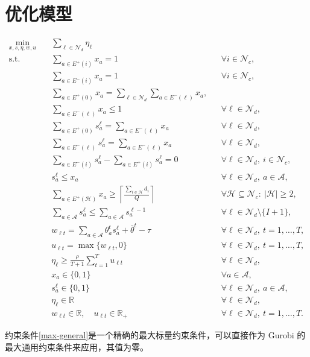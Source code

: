 \documentclass[11pt]{article}
\begin{document}
\section{优化模型}

\begin{align}
\min_{x,s,\eta,w,u}\quad
&\sum_{\ell\in\mathcal{N}_d}\eta_\ell
\label{obj}\\[1ex]
\text{s.t.}\quad
&\sum_{a\in E^+(i)}x_a=1
&&\forall i\in\mathcal{N}_c,
\label{customer-out}\\
&\sum_{a\in E^-(i)}x_a=1
&&\forall i\in\mathcal{N}_c,
\label{customer-in}\\
&\sum_{a\in E^+(0)}x_a
 =\sum_{\ell\in\mathcal{N}_d}\sum_{a\in E^-(\ell)}x_a,
\label{depot-balance}\\
&\sum_{a\in E^-(\ell)}x_a\leq 1
&&\forall \ell\in\mathcal{N}_d,
\label{destination-use}\\
&\sum_{a\in E^+(0)}s_a^\ell
 =\sum_{a\in E^-(\ell)}x_a
&&\forall \ell\in\mathcal{N}_d,
\label{route-start}\\
&\sum_{a\in E^-(\ell)}s_a^\ell
 =\sum_{a\in E^-(\ell)}x_a
&&\forall \ell\in\mathcal{N}_d,
\label{route-end}\\
&\sum_{a\in E^-(i)}s_a^\ell
 -\sum_{a\in E^+(i)}s_a^\ell=0
&&\forall \ell\in\mathcal{N}_d,\ i\in\mathcal{N}_c,
\label{route-flow}\\
&s_a^\ell\leq x_a
&&\forall \ell\in\mathcal{N}_d,\ a\in\mathcal{A},
\label{route-link}\\
&\sum_{a\in E^+(\mathcal{H})}x_a
 \geq
 \left\lceil\frac{\sum_{i\in\mathcal{H}}d_i}{Q}\right\rceil
&&\forall \mathcal{H}\subseteq\mathcal{N}_c:\ |\mathcal{H}|\geq 2,
\label{capacity-cuts}\\
&\sum_{a\in\mathcal{A}}s_a^\ell
 \leq
 \sum_{a\in\mathcal{A}}s_a^{\ell-1}
&&\forall \ell\in\mathcal{N}_d\setminus\{I+1\},
\label{route-ordering}\\
&w_{\ell t}
 =\sum_{a\in\mathcal{A}}\theta_a^t s_a^\ell
  +\bar\theta^t-\tau
&&\forall \ell\in\mathcal{N}_d,\ t=1,\ldots,T,
\label{affine-risk}\\
&u_{\ell t}=\max\{w_{\ell t},0\}
&&\forall \ell\in\mathcal{N}_d,\ t=1,\ldots,T,
\label{max-general}\\
&\eta_\ell
 \geq
 \frac{\rho}{T+1}\sum_{t=1}^{T}u_{\ell t}
&&\forall \ell\in\mathcal{N}_d,
\label{surrogate-risk}\\
&x_a\in\{0,1\}
&&\forall a\in\mathcal{A},
\label{x-domain}\\
&s_a^\ell\in\{0,1\}
&&\forall \ell\in\mathcal{N}_d,\ a\in\mathcal{A},
\label{s-domain}\\
&\eta_\ell\in\mathbb{R}
&&\forall \ell\in\mathcal{N}_d,
\label{eta-domain}\\
&w_{\ell t}\in\mathbb{R},\quad u_{\ell t}\in\mathbb{R}_{+}
&&\forall \ell\in\mathcal{N}_d,\ t=1,\ldots,T.
\label{aux-domains}
\end{align}

约束条件\eqref{max-general}是一个精确的最大标量约束条件，可以直接作为 Gurobi 的最大通用约束条件来应用，其值为零。
\end{document}
